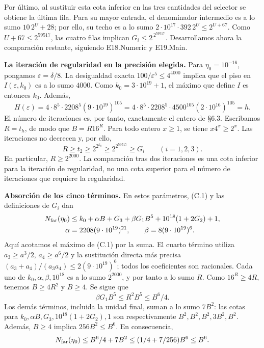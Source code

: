 \documentclass[spanish,11pt,a4paper]{article}
\begin{document}
Por último, al sustituir esta cota inferior en las tres cantidades del selector se obtiene la última fila. Para su mayor entrada, el denominador intermedio es a lo sumo \(10\,2^U+28\); por ello, su techo es a lo sumo \(2\cdot10^{17}\cdot392\,2^U\le2^{U+67}\). Como \(U+67\le2^{59517}\), las cuatro filas implican \(G_i\le2^{\,2^{59517}}\). Desarrollamos ahora la comparación restante, siguiendo {\ttfamily\small E18.\discretionary{\hbox{\ensuremath{\hookrightarrow}}}{}{}Numeric} y {\ttfamily\small E19.\discretionary{\hbox{\ensuremath{\hookrightarrow}}}{}{}Main}.

\textbf{La iteración de regularidad en la precisión elegida.} Para \(\eta_0=10^{-16}\), pongamos \(\varepsilon=\delta/8\). La desigualdad exacta \(100/\varepsilon^5\le4^{4000}\) implica que el piso en \(I(\varepsilon,k_0)\) es a lo sumo \(4000\). Como \(k_0=3\cdot10^{19}+1\), el máximo que define \(I\) es entonces \(k_0\). Además, \[
H(\varepsilon)=4\cdot8^5\cdot2208^5(9\cdot10^{19})^{105}
=4\cdot8^5\cdot2208^5\cdot4500^{105}(2\cdot10^{16})^{105}=h.
\] El número de iteraciones es, por tanto, exactamente el entero de §6.3. Escribamos \(R=t_h\), de modo que \(B=R16^R\). Para todo entero \(x\ge1\), se tiene \(x4^x\ge2^x\). Las iteraciones no decrecen y, por ello, \[
R\ge t_2\ge2^{2^{k_0}}\ge2^{2^{59517}}\ge G_i
\qquad(i=1,2,3).
\] En particular, \(R\ge2^{2000}\). La comparación tras dos iteraciones es una cota inferior para la iteración de regularidad, no una cota superior para el número de iteraciones que requiere la regularidad.

\textbf{Absorción de los cinco términos.} En estos parámetros, (C.1) y las definiciones de \(G_i\) dan \[
\begin{aligned}
N_{\rm far}(\eta_0)\le{}& k_0+\alpha B+G_3+\beta G_1B^5
+10^{18}(1+2G_2)+1,\\
\alpha={}&2208(9\cdot10^{19})^{21},\qquad
\beta=8(9\cdot10^{19})^6.
\end{aligned}
\] Aquí acotamos el máximo de (C.1) por la suma. El cuarto término utiliza \(a_3\ge a^3/2\), \(a_4\ge a^6/2\) y la sustitución directa más precisa \((a_3+a_4)/(a_3a_4)\le2(9\cdot10^{19})^6\); todos los coeficientes son racionales. Cada uno de \(k_0,\alpha,\beta,10^{18}\) es a lo sumo \(2^{2000}\), y por tanto a lo sumo \(R\). Como \(16^R\ge4R\), tenemos \(B\ge4R^2\) y \(B\ge4\). Se sigue que \[
\beta G_1B^5\le R^2B^5\le B^6/4.
\] Los demás términos, incluida la unidad final, suman a lo sumo \(7B^2\): las cotas para \(k_0,\alpha B,G_3,10^{18}(1+2G_2),1\) son respectivamente \(B^2,B^2,B^2,3B^2,B^2\). Además, \(B\ge4\) implica \(256B^2\le B^6\). En consecuencia, \[
N_{\rm far}(\eta_0)\le B^6/4+7B^2
\le(1/4+7/256)B^6\le B^6.
\]
\end{document}
